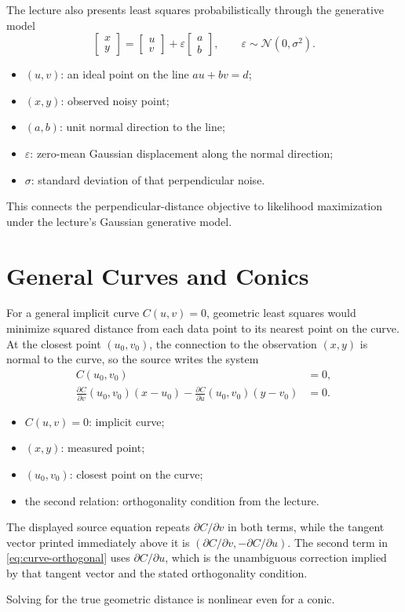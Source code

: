 \documentclass[11pt,a4paper,oneside]{report}
\newcommand{\mathlegend}[1]{%
  \par\vspace{0.2em}{\small\itshape where}\par
  \begin{itemize}[leftmargin=1.7em,topsep=0.15em,itemsep=0.12em]
  #1
  \end{itemize}
}
\begin{document}
The lecture also presents least squares probabilistically through the generative model
\begin{equation}
  \begin{bmatrix}x\\y\end{bmatrix}
  =\begin{bmatrix}u\\v\end{bmatrix}
   +\varepsilon\begin{bmatrix}a\\b\end{bmatrix},
  \qquad \varepsilon\sim\mathcal{N}(0,\sigma^2).
  \label{eq:tls-generative-model}
\end{equation}
\mathlegend{
  \item $(u,v)$: an ideal point on the line $au+bv=d$;
  \item $(x,y)$: observed noisy point;
  \item $(a,b)$: unit normal direction to the line;
  \item $\varepsilon$: zero-mean Gaussian displacement along the normal direction;
  \item $\sigma$: standard deviation of that perpendicular noise.
}
This connects the perpendicular-distance objective to likelihood maximization under the lecture's Gaussian generative model.

\section{General Curves and Conics}

For a general implicit curve $C(u,v)=0$, geometric least squares would minimize squared distance from each data point to its nearest point on the curve. At the closest point $(u_0,v_0)$, the connection to the observation $(x,y)$ is normal to the curve, so the source writes the system
\begin{align}
  C(u_0,v_0)&=0,\label{eq:curve-on-surface}\\
  \frac{\partial C}{\partial v}(u_0,v_0)(x-u_0)
  -\frac{\partial C}{\partial u}(u_0,v_0)(y-v_0)&=0.
  \label{eq:curve-orthogonal}
\end{align}
\mathlegend{
  \item $C(u,v)=0$: implicit curve;
  \item $(x,y)$: measured point;
  \item $(u_0,v_0)$: closest point on the curve;
  \item the second relation: orthogonality condition from the lecture.
}
\begin{warningbox}
The displayed source equation repeats $\partial C/\partial v$ in both terms, while the tangent vector printed immediately above it is $(\partial C/\partial v,-\partial C/\partial u)$. The second term in \cref{eq:curve-orthogonal} uses $\partial C/\partial u$, which is the unambiguous correction implied by that tangent vector and the stated orthogonality condition.
\end{warningbox}
Solving for the true geometric distance is nonlinear even for a conic.
\end{document}
